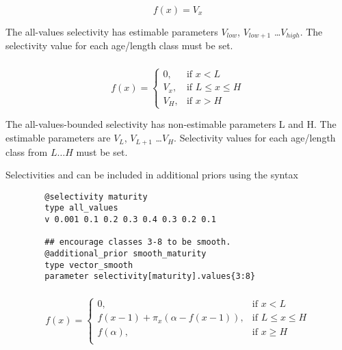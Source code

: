 \begin{equation}
f(x)=V_x
\end{equation}

The all-values selectivity has estimable parameters $V_{low}$, $V_{low+1}$ \ldots $V_{high}$. The selectivity value for each age/length class must be set.

\subsubsection[All-values-bounded]{}\label{sec:Selectivity-AllValuesBounded}

\begin{equation}
f(x)=\begin{cases}
		 0, & \text{if $x < L$} \\
		 V_x, & \text{if $L \le x \le H$} \\
		 V_H, & \text{if $x > H$}
  \end{cases}
\end{equation}

The all-values-bounded selectivity has non-estimable parameters L and H. The estimable parameters are $V_L$, $V_{L+1}$ \ldots $V_H$. Selectivity values for each age/length class from $L \ldots H$ must be set.

Selectivities  and  can be included in additional priors using the syntax

{\small{\begin{verbatim}
		@selectivity maturity
		type all_values
		v 0.001 0.1 0.2 0.3 0.4 0.3 0.2 0.1

		## encourage classes 3-8 to be smooth.
		@additional_prior smooth_maturity
		type vector_smooth
		parameter selectivity[maturity].values{3:8}
		\end{verbatim}}}

\subsubsection[Increasing ]{} \label{sec:Selectivity-Increasing}

\begin{equation}
f(x)=\begin{cases}
	  0, & \text{if $x < L$} \\
	  f(x-1)+ \pi_x(\alpha-f(x-1)), & \text{if $L \le x \le H$} \\
	  f(\alpha), & \text{if $x \ge H$} \\
  \end{cases}
\end{equation}

